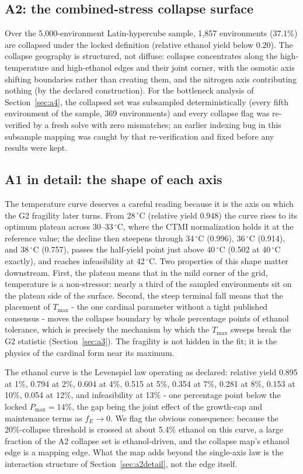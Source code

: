 \documentclass[12pt]{article}
\begin{document}
\subsection{A2: the combined-stress collapse surface}

Over the 5{,}000-environment Latin-hypercube sample, 1{,}857
environments (37.1\%) are collapsed under the locked definition
(relative ethanol yield below 0.20). The collapse geography is
structured, not diffuse: collapse concentrates along the high-temperature
and high-ethanol edges and their joint corner, with the osmotic axis
shifting boundaries rather than creating them, and the nitrogen axis
contributing nothing (by the declared construction). For the
bottleneck analysis of Section~\ref{sec:a4}, the collapsed set was
subsampled deterministically (every fifth environment of the sample,
369 environments) and every collapse flag was re-verified by a fresh
solve with zero mismatches; an earlier indexing bug in this subsample
mapping was caught by that re-verification and fixed before any
results were kept.


\subsection{A1 in detail: the shape of each axis}

The temperature curve deserves a careful reading because it is the
axis on which the G2 fragility later turns. From 28\,$^{\circ}$C
(relative yield 0.948) the curve rises to its optimum plateau across
30--33\,$^{\circ}$C, where the CTMI normalization holds it at the
reference value; the decline then steepens through 34\,$^{\circ}$C
(0.996), 36\,$^{\circ}$C (0.914), and 38\,$^{\circ}$C (0.757), passes
the half-yield point just above 40\,$^{\circ}$C (0.502 at
40\,$^{\circ}$C exactly), and reaches infeasibility at
42\,$^{\circ}$C. Two properties of this shape matter downstream.
First, the plateau means that in the mild corner of the grid,
temperature is a non-stressor: nearly a third of the sampled
environments sit on the plateau side of the surface. Second, the
steep terminal fall means that the placement of $T_{\max}$ - the one
cardinal parameter without a tight published consensus - moves the
collapse boundary by whole percentage points of ethanol tolerance,
which is precisely the mechanism by which the $T_{\max}$ sweeps break
the G2 statistic (Section~\ref{sec:a3}). The fragility is not hidden
in the fit; it is the physics of the cardinal form near its maximum.

The ethanol curve is the Levenspiel law operating as declared:
relative yield 0.895 at 1\%, 0.794 at 2\%, 0.604 at 4\%, 0.515 at
5\%, 0.354 at 7\%, 0.281 at 8\%, 0.153 at 10\%, 0.054 at 12\%, and
infeasibility at 13\% - one percentage point below the locked
$P_{\max}=14\%$, the gap being the joint effect of the growth-cap and
maintenance terms as $f_E\to 0$. We flag the obvious consequence:
because the 20\%-collapse threshold is crossed at about 5.4\% ethanol
on this curve, a large fraction of the A2 collapse set is
ethanol-driven, and the collapse map's ethanol edge is a mapping
edge. What the map adds beyond the single-axis law is the interaction
structure of Section~\ref{sec:a2detail}, not the edge itself.
\end{document}
